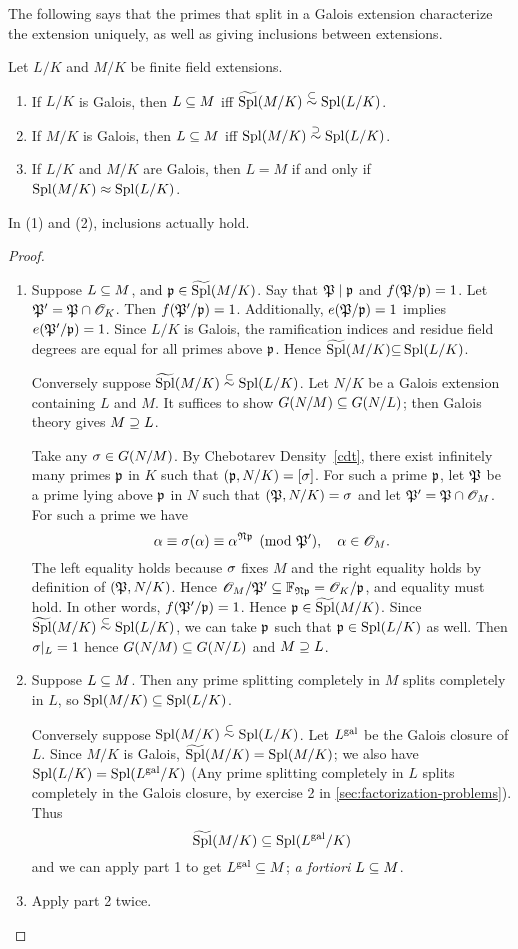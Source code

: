 The following says that the primes that split in a Galois extension characterize the extension uniquely, as well as giving inclusions between extensions.
\begin{thm}
Let $L/K$ and $M/K$ be finite field extensions. %
\begin{enumerate}
\item If $L/K$ is Galois, then $L\subseteq M$ iff $\widetilde{\operatorname{Spl}}(M/K)\stackrel{\subset}{\sim}\operatorname{Spl}(L/K)$.
\item If $M/K$ is Galois, then $L\subseteq M$ iff $\operatorname{Spl}(M/K)\stackrel{\supset}{\sim}\operatorname{Spl}(L/K)$.
\item If $L/K$ and $M/K$ are Galois, then $L=M$ if and only if $\operatorname{Spl}(M/K)\approx\operatorname{Spl}(L/K)$. 
\end{enumerate}
In (1) and (2), inclusions actually hold.
\end{thm}
\begin{proof}$\,$
\begin{enumerate}
\item Suppose $L\subseteq M$, and $\mathfrak{p}\in \widetilde{\operatorname{Spl}}(M/K)$. Say that $\mathfrak{P}\mid \mathfrak{p}$ and $f(\mathfrak{P}/\mathfrak{p})=1$. Let $\mathfrak{P}'=\mathfrak{P}\cap \mathscr{O}_K$. 
Then $f(\mathfrak{P}'/\mathfrak{p})=1$. Additionally, $e(\mathfrak{P}/\mathfrak{p})=1$ implies $e(\mathfrak{P}'/\mathfrak{p})=1$. Since $L/K$ is Galois, the ramification indices and residue field degrees are equal for all primes above $\mathfrak{p}$. Hence $\widetilde{\operatorname{Spl}}(M/K){\subseteq} \operatorname{Spl}(L/K)$.

Conversely suppose $\widetilde{\operatorname{Spl}}(M/K)\stackrel{\subset}{\sim} \operatorname{Spl}(L/K)$. Let $N/K$ be a Galois extension containing $L$ and $M$. It suffices to show $G(N/M)\subseteq G(N/L)$; then Galois theory gives $M\supseteq L$.

Take any $\sigma\in G(N/M)$. 
By Chebotarev Density~\ref{cdt}, there exist infinitely many primes $\mathfrak{p}$ in $K$ such that $(\mathfrak{p}, N/K)=[\sigma]$. For such a prime $\mathfrak{p}$, let $\mathfrak{P}$ be a prime lying above $\mathfrak{p}$ in $N$ such that $(\mathfrak{P},N/K)=\sigma$ and let $\mathfrak{P}'=\mathfrak{P}\cap \mathscr{O}_M$. 
For such a prime we have
\[
\alpha \equiv \sigma(\alpha)\equiv \alpha^{\mathfrak{N} \mathfrak{p}}\pmod{\mathfrak{P}'}, \quad \alpha\in \mathscr{O}_M.
\]
The left equality holds because $\sigma$ fixes $M$ and the right equality holds by definition of $(\mathfrak{P},N/K)$. Hence $\mathscr{O}_M/\mathfrak{P}'\subseteq \mathbb{F}_{\mathfrak{N}\mathfrak{p}}=\mathscr{O}_K/\mathfrak{p}$, and equality must hold. In other words, $f(\mathfrak{P}'/\mathfrak{p})=1$. Hence $\mathfrak{p}\in \widetilde{\operatorname{Spl}}(M/K)$. Since $\widetilde{\operatorname{Spl}}(M/K)\stackrel{\subset}{\sim} \operatorname{Spl}(L/K)$, we can take $\mathfrak{p}$ such that $\mathfrak{p}\in \operatorname{Spl}(L/K)$ as well. Then $\sigma|_L=1$ hence $G(N/M)\subseteq G(N/L)$ and $M\supseteq L$.
\item
Suppose $L\subseteq M$. Then any prime splitting completely in $M$ splits completely in $L$, so $\operatorname{Spl}(M/K)\subseteq \operatorname{Spl}(L/K)$.

Conversely suppose $\operatorname{Spl}(M/K)\stackrel{\subset}{\sim} \operatorname{Spl}(L/K)$. Let $L^{\text{gal}}$ be the Galois closure of $L$. Since $M/K$ is Galois, $\widetilde{\operatorname{Spl}}(M/K)=\operatorname{Spl}(M/K)$; we also have $\operatorname{Spl}(L/K)=\operatorname{Spl}(L^{\text{gal}}/K)$ (Any prime splitting completely in $L$ splits completely in the Galois closure, by exercise 2 in \ref{sec:factorization-problems}).
Thus
\[
\widetilde{\operatorname{Spl}}(M/K)\subseteq \operatorname{Spl}(L^{\text{gal}}/K)
\]
and we can apply part 1 to get $L^{\text{gal}}\subseteq M$; {\it a fortiori} $L\subseteq M$.
\item Apply part 2 twice.\qedhere
\end{enumerate}
\end{proof}
